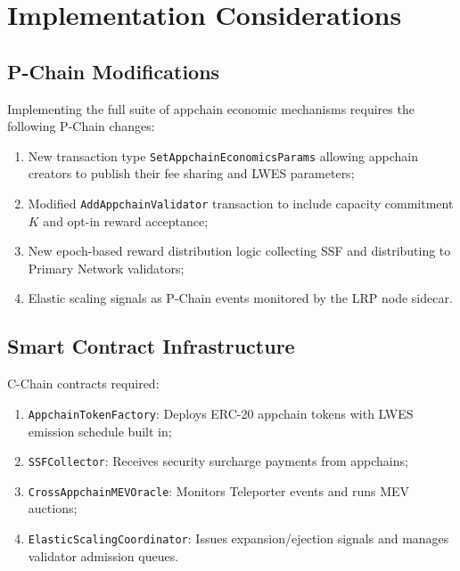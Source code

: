 \documentclass[11pt]{article}
\begin{document}
\section{Implementation Considerations}

\subsection{P-Chain Modifications}

Implementing the full suite of appchain economic mechanisms requires the following P-Chain
changes:

\begin{enumerate}[leftmargin=1.5em]
  \item New transaction type \texttt{SetAppchainEconomicsParams} allowing appchain creators
    to publish their fee sharing and LWES parameters;
  \item Modified \texttt{AddAppchainValidator} transaction to include capacity commitment
    $K$ and opt-in reward acceptance;
  \item New epoch-based reward distribution logic collecting SSF and distributing to
    Primary Network validators;
  \item Elastic scaling signals as P-Chain events monitored by the LRP node sidecar.
\end{enumerate}

\subsection{Smart Contract Infrastructure}

C-Chain contracts required:

\begin{enumerate}[leftmargin=1.5em]
  \item \texttt{AppchainTokenFactory}: Deploys ERC-20 appchain tokens with LWES emission schedule built in;
  \item \texttt{SSFCollector}: Receives security surcharge payments from appchains;
  \item \texttt{CrossAppchainMEVOracle}: Monitors Teleporter events and runs MEV auctions;
  \item \texttt{ElasticScalingCoordinator}: Issues expansion/ejection signals and manages
    validator admission queues.
\end{enumerate}
\end{document}
